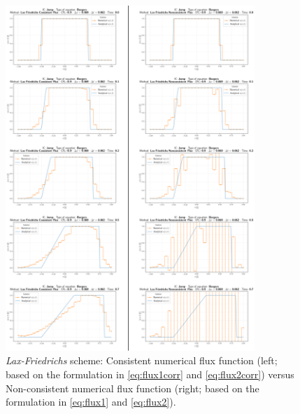 \begin{figure}[ht]
	\includegraphics[width=0.84\textwidth]{LFconsistency.eps}
	\caption{\emph{Lax-Friedrichs} scheme:
		Consistent numerical flux function
		(left; based on the formulation in \eqref{eq:flux1corr} and \eqref{eq:flux2corr})
		versus Non-consistent numerical flux function
		(right; based on the formulation in \eqref{eq:flux1} and \eqref{eq:flux2}).}
	\label{\LABEL}
\end{figure}
